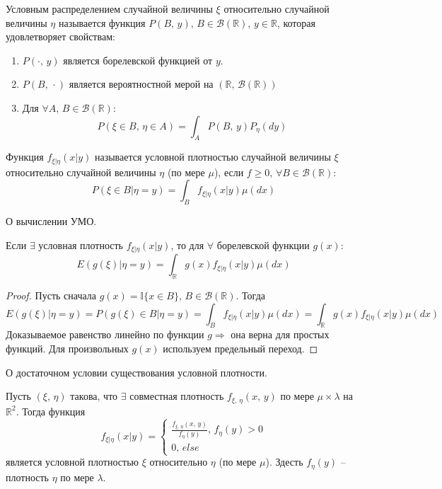 \begin{definition}
	Условным распределением случайной величины $\xi$ относительно случайной величины $\eta$ называется функция $P(B,\, y),\, B \in \mathcal{B}(\mathbb{R}),\, y \in \mathbb{R}$, которая удовлетворяет свойствам:
	\begin{enumerate}
		\item $P(\cdot,\, y)$ является борелевской функцией от $y$.
		\item $P(B,\, \cdot)$ является вероятностной мерой на $(\mathbb{R},\, \mathcal{B}(\mathbb{R}))$
		\item Для $\forall A,\, B \in \mathcal{B}(\mathbb{R})$:
		      \[P(\xi \in B,\, \eta \in A) = \int_AP(B,\,y)P_\eta(dy)\]
	\end{enumerate}
\end{definition}

\begin{definition}
	Функция $f_{\xi | \eta}(x | y)$ называется условной плотностью случайной величины $\xi$ относительно случайной величины $\eta$ (по мере $\mu$), если $f \geq 0,\, \forall B \in \mathcal{B}(\mathbb{R})$:
	\[P(\xi \in B | \eta = y) = \int_B f_{\xi | \eta}(x | y)\mu(dx)\]
\end{definition}

\begin{theorem}
	О вычислении УМО.

	Если $\exists$ условная плотность $f_{\xi | \eta}(x | y)$, то для $\forall$ борелевской функции $g(x)$:
	\[E(g(\xi) | \eta = y) = \int_\mathbb{R}g(x)f_{\xi | \eta}(x | y)\mu(dx)\]
\end{theorem}

\begin{proof}
	Пусть сначала $g(x) = \mathbb{I}\{x \in B\},\, B \in \mathcal{B}(\mathbb{R})$. Тогда
	\[E(g(\xi) | \eta = y) = P(g(\xi) \in B | \eta = y) = \int_B f_{\xi | \eta}(x | y)\mu(dx) = \int_\mathbb{R} g(x)f_{\xi | \eta}(x | y) \mu(dx)\]
	Доказываемое равенство линейно по функции $g \Rightarrow$ она верна для простых функций. Для произвольных $g(x)$ используем предельный переход.
\end{proof}

\begin{theorem}
	О достаточном условии существования условной плотности.

	Пусть $(\xi,\, \eta)$ такова, что $\exists$ совместная плотность $f_{\xi,\, \eta}(x,\, y)$ по мере $\mu \times \lambda$ на $\mathbb{R}^2$. Тогда функция
	\[
		f_{\xi | \eta}(x | y) =
		\begin{cases}
			\frac{f_{\xi,\, \eta}(x,\,y)}{f_\eta(y)},\, f_\eta(y) > 0 \\
			0,\, else
		\end{cases}
	\]
	является условной плотностью $\xi$ относительно $\eta$ (по мере $\mu$). Здесть $f_\eta(y)$ -- плотность $\eta$ по мере $\lambda$.
\end{theorem}

